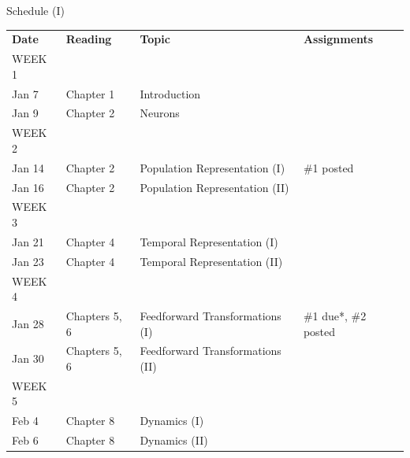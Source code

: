 \documentclass[aspectratio=169]{beamer}
\begin{document}
\begin{frame}{Schedule (I)}
\small
\begin{tabular}{p{2cm} p{2cm} p{5cm} p{3cm}}
	\toprule
	\textbf{Date} &	\textbf{Reading} &	\textbf{Topic} & \textbf{Assignments} \\
	\tiny WEEK 1 & & & \\
	Jan 7 &
	Chapter 1 &
	Introduction &
	\\
	Jan 9 &
	Chapter 2 &
	Neurons &
	\\[0.05cm]
	
	\tiny WEEK 2 & & & \\
	Jan 14 &
	Chapter 2 &
	Population Representation (I) &
	\#1 posted\\
	Jan 16 &
	Chapter 2 &
	Population Representation (II) &
	\\[0.05cm]
	
	\tiny WEEK 3 & & & \\
	Jan 21 &
	Chapter 4 &
	Temporal Representation (I) &
	\\
	Jan 23 &
	Chapter 4 &
	Temporal Representation (II) &
	\\[0.05cm]
	
	\tiny WEEK 4 & & & \\
	Jan 28 &
	Chapters 5, 6 &
	Feedforward Transformations (I) &
	\#1 due*, \#2 posted\\
	Jan 30 &
	Chapters 5, 6 &
	Feedforward Transformations (II) &
	\\[0.05cm]
	
	\tiny WEEK 5 & & & \\
	Feb 4 &
	Chapter 8 &
	Dynamics (I) &
	\\
	Feb 6 &
	Chapter 8 &
	Dynamics (II) &
	\\
	\bottomrule
\end{tabular}
\end{frame}
\end{document}
